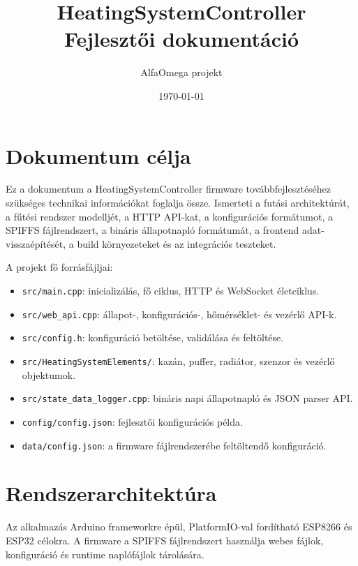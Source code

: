 \documentclass[11pt,a4paper]{article}
\title{HeatingSystemController\\Fejlesztői dokumentáció}
\author{AlfaOmega projekt}
\date{\today}
\begin{document}
\maketitle
\tableofcontents
\newpage

\section{Dokumentum célja}

Ez a dokumentum a HeatingSystemController firmware továbbfejlesztéséhez szükséges technikai információkat foglalja össze. Ismerteti a futási architektúrát, a fűtési rendszer modelljét, a HTTP API-kat, a konfigurációs formátumot, a SPIFFS fájlrendszert, a bináris állapotnapló formátumát, a frontend adat-visszaépítését, a build környezeteket és az integrációs teszteket.

A projekt fő forrásfájljai:

\begin{itemize}
  \item \texttt{src/main.cpp}: inicializálás, fő ciklus, HTTP és WebSocket életciklus.
  \item \texttt{src/web\_api.cpp}: állapot-, konfigurációs-, hőmérséklet- és vezérlő API-k.
  \item \texttt{src/config.h}: konfiguráció betöltése, validálása és feltöltése.
  \item \texttt{src/HeatingSystemElements/}: kazán, puffer, radiátor, szenzor és vezérlő objektumok.
  \item \texttt{src/state\_data\_logger.cpp}: bináris napi állapotnapló és JSON parser API.
  \item \texttt{config/config.json}: fejlesztői konfigurációs példa.
  \item \texttt{data/config.json}: a firmware fájlrendszerébe feltöltendő konfiguráció.
\end{itemize}

\section{Rendszerarchitektúra}

Az alkalmazás Arduino frameworkre épül, PlatformIO-val fordítható ESP8266 és ESP32 célokra. A firmware a SPIFFS fájlrendszert használja webes fájlok, konfiguráció és runtime naplófájlok tárolására.
\end{document}
